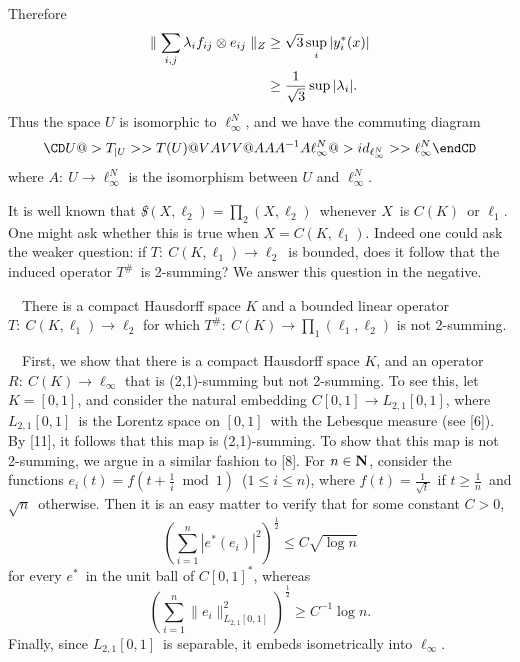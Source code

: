 Therefore
$$
\aligned
\parallel \sum\limits_{i,j}\lambda_if_{ij}\otimes 
e_{ij}\parallel_Z&\geq
\sqrt 3 \sup\limits_i |y^*_i(x)|\\
&\geq \dfrac 1{\sqrt 3}\sup |\lambda_i|.\endaligned
$$
Thus the space $U$ is isomorphic to $\ell^N_\infty$, and we have the
commuting diagram
$$
\CD
U @>{T_{|U}}>> T(U)\\
@VAVV          @AA{A^{-1}}A\\
\ell^N_\infty  @>{id_{\ell^N_\infty}}>> \ell^N_\infty\endCD
$$
where $A:\ U\rightarrow \ell^N_\infty$ is the isomorphism between $U$ 
and
$\ell^N_\infty$.
\endproof

\bigskip


It is well known that {\it \$}$(X,\ell_2)=\prod_2(X,
\ell_2)$\ whenever $X$\ is $C(K)$\ or $\ell_1$. One might ask whether 
this is
true when $X = C(K,\ell_1)$. Indeed one could ask the weaker question: 
if $T:\
C(K, \ell_1)\longrightarrow \ell_2$\ is bounded, does it follow that 
the
induced operator $T^\#$\ is 2-summing? We answer this question in the 
negative.

\bigskip

\ \ There is a compact Hausdorff space $K$ 
and
a bounded linear operator $T:\ C(K, \ell_1)\longrightarrow \ell_2$ for
which $T^\#:\ C(K)\longrightarrow \prod_1(\ell_1, \ell_2)$ is not
2-summing.

\medskip

\ \  First, we show that there is a compact 
Hausdorff
space $K$, and an operator $R:\ C(K)\longrightarrow \ell_\infty$ that 
is
(2,1)-summing but not 2-summing. To see this, let $K=[0,1]$, and 
consider the
natural embedding $C[0,1] \longrightarrow L_{2,1}[0,1]$, where 
$L_{2,1}[0,1]$\
is the Lorentz space on $[0,1]$\ with the Lebesque measure (see [6]). 
By
[11], it follows that this map is (2,1)-summing. To show that this map
is not 2-summing, we argue in a similar fashion to [8]. For $n\in\hbox{\bf N}$,
consider the functions $e_i(t) = f(t+\frac 1i \bmod 1)$\ ($1\le i\le 
n$), where
$ f(t) = \frac 1{\sqrt t}$\ if $t\ge \frac 1n$\ and $\sqrt n$\
otherwise. Then it is an easy matter to verify that for some constant
$C>0$, $$ \left( \sum_{i=1}^n |e^*(e_i)|^2 \right)^{\frac12} \le C 
\sqrt{\log n}
$$ for every $e^*$\ in the unit ball of $C[0,1]^*$, whereas
$$ \left( \sum_{i=1}^n \| e_i \|_{L_{2,1}[0,1]}^2 \right)^{\frac12}
\ge C^{-1} \log n .
$$ 
Finally, since $L_{2,1}[0,1]$\ is separable, it embeds isometrically
into $\ell_\infty$.

